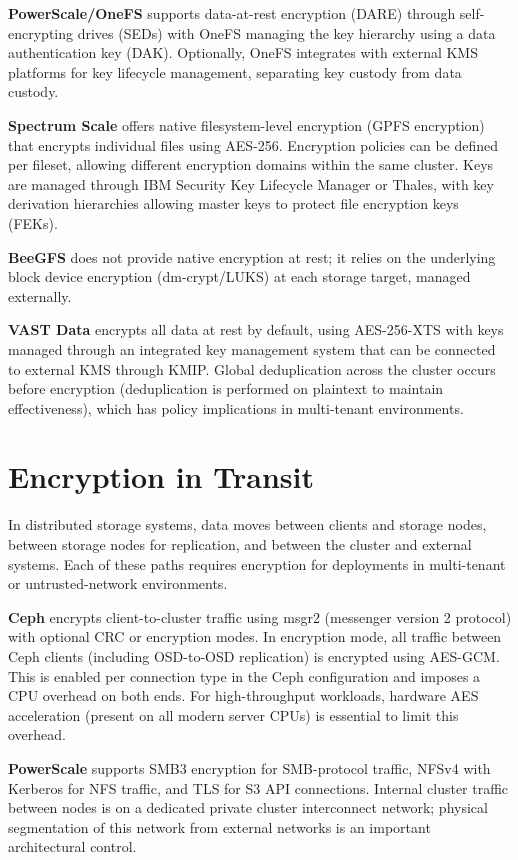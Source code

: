 \textbf{PowerScale/OneFS} supports data-at-rest encryption (DARE) through self-encrypting drives (SEDs) with OneFS managing the key hierarchy using a data authentication key (DAK). Optionally, OneFS integrates with external KMS platforms for key lifecycle management, separating key custody from data custody.

\textbf{Spectrum Scale} offers native filesystem-level encryption (GPFS encryption) that encrypts individual files using AES-256. Encryption policies can be defined per fileset, allowing different encryption domains within the same cluster. Keys are managed through IBM Security Key Lifecycle Manager or Thales, with key derivation hierarchies allowing master keys to protect file encryption keys (FEKs).

\textbf{BeeGFS} does not provide native encryption at rest; it relies on the underlying block device encryption (dm-crypt/LUKS) at each storage target, managed externally.

\textbf{VAST Data} encrypts all data at rest by default, using AES-256-XTS with keys managed through an integrated key management system that can be connected to external KMS through KMIP. Global deduplication across the cluster occurs before encryption (deduplication is performed on plaintext to maintain effectiveness), which has policy implications in multi-tenant environments.

\section{Encryption in Transit}
In distributed storage systems, data moves between clients and storage nodes, between storage nodes for replication, and between the cluster and external systems. Each of these paths requires encryption for deployments in multi-tenant or untrusted-network environments.

\textbf{Ceph} encrypts client-to-cluster traffic using msgr2 (messenger version 2 protocol) with optional CRC or encryption modes. In encryption mode, all traffic between Ceph clients (including OSD-to-OSD replication) is encrypted using AES-GCM. This is enabled per connection type in the Ceph configuration and imposes a CPU overhead on both ends. For high-throughput workloads, hardware AES acceleration (present on all modern server CPUs) is essential to limit this overhead.

\textbf{PowerScale} supports SMB3 encryption for SMB-protocol traffic, NFSv4 with Kerberos for NFS traffic, and TLS for S3 API connections. Internal cluster traffic between nodes is on a dedicated private cluster interconnect network; physical segmentation of this network from external networks is an important architectural control.

